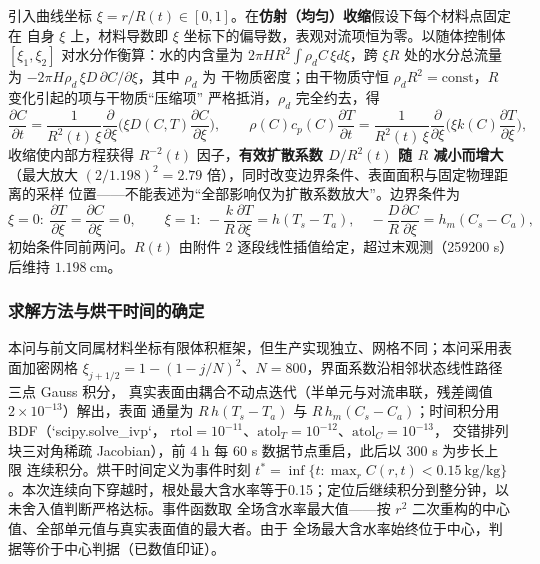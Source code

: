 引入曲线坐标 $\xi=r/R(t)\in[0,1]$。在\textbf{仿射（均匀）收缩}假设下每个材料点固定在
自身 $\xi$ 上，材料导数即 $\xi$ 坐标下的偏导数，表观对流项恒为零。以随体控制体
$[\xi_1,\xi_2]$ 对水分作衡算：水的内含量为 $2\pi H R^2\int\rho_d C\,\xi d\xi$，跨
$\xi R$ 处的水分总流量为 $-2\pi H\rho_d\,\xi D\,\partial C/\partial\xi$，其中 $\rho_d$ 为
干物质密度；由干物质守恒 $\rho_dR^2=\mathrm{const}$，$R$ 变化引起的项与干物质“压缩项”
严格抵消，$\rho_d$ 完全约去，得
\begin{equation}
  \frac{\partial C}{\partial t}
  =\frac{1}{R^2(t)\,\xi}\frac{\partial}{\partial\xi}\Big(\xi D(C,T)\frac{\partial C}{\partial\xi}\Big),
  \qquad
  \rho(C)c_p(C)\frac{\partial T}{\partial t}
  =\frac{1}{R^2(t)\,\xi}\frac{\partial}{\partial\xi}\Big(\xi k(C)\frac{\partial T}{\partial\xi}\Big),
  \label{eq:mov}
\end{equation}
收缩使内部方程获得 $R^{-2}(t)$ 因子，\textbf{有效扩散系数 $D/R^2(t)$ 随 $R$ 减小而增大}
（最大放大 $(2/1.198)^2=2.79$ 倍），同时改变边界条件、表面面积与固定物理距离的采样
位置——不能表述为“全部影响仅为扩散系数放大”。边界条件为
\begin{equation}
  \xi=0:\ \frac{\partial T}{\partial\xi}=\frac{\partial C}{\partial\xi}=0,\qquad
  \xi=1:\ -\frac{k}{R}\frac{\partial T}{\partial\xi}=h(T_s-T_a),\quad
  -\frac{D}{R}\frac{\partial C}{\partial\xi}=h_m(C_s-C_a),
  \label{eq:movbc}
\end{equation}
初始条件同前两问。$R(t)$ 由附件 2 逐段线性插值给定，超过末观测（259200 s）后维持
$1.198\ \mathrm{cm}$。

\subsubsection{求解方法与烘干时间的确定}

本问与前文同属材料坐标有限体积框架，但生产实现独立、网格不同；本问采用表面加密网格
$\xi_{j+1/2}=1-(1-j/N)^2$、$N=800$，界面系数沿相邻状态线性路径三点 Gauss 积分，
真实表面由耦合不动点迭代（半单元与对流串联，残差阈值 $2\times10^{-13}$）解出，表面
通量为 $R\,h(T_s-T_a)$ 与 $R\,h_m(C_s-C_a)$；时间积分用 BDF（`scipy.solve_ivp`，
$\mathrm{rtol}=10^{-11}$、$\mathrm{atol}_T=10^{-12}$、$\mathrm{atol}_C=10^{-13}$，
交错排列块三对角稀疏 Jacobian），前 4 h 每 60 s 数据节点重启，此后以 300 s 为步长上限
连续积分。烘干时间定义为事件时刻
$t^*=\inf\{t:\max_r C(r,t)<0.15\ \mathrm{kg/kg}\}$。本次连续向下穿越时，根处最大含水率等于0.15；定位后继续积分到整分钟，以未舍入值判断严格达标。事件函数取
全场含水率最大值——按 $r^2$ 二次重构的中心值、全部单元值与真实表面值的最大者。由于
全场最大含水率始终位于中心，判据等价于中心判据（已数值印证）。

